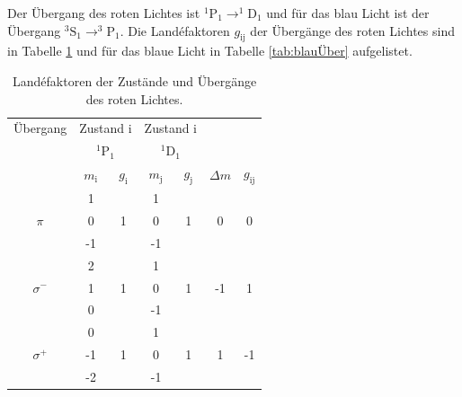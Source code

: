 Der Übergang des roten Lichtes ist $^1\text{P}_1 \rightarrow ^1\text{D}_1$ und für das 
blau Licht ist der Übergang $^3\text{S}_1 \rightarrow ^3\text{P}_1$.
Die Landéfaktoren $g_{\text{ij}}$ der Übergänge des roten Lichtes sind in Tabelle \ref{tab:rotÜber} und 
für das blaue Licht in Tabelle \ref{tab:blauÜber} aufgelistet.
\FloatBarrier
\begin{table}
    \centering
    \caption{Landéfaktoren der Zustände und Übergänge des roten Lichtes.}
    \label{tab:rotÜber}
    \begin{tabular}{c| c c| c c| c c}
        \toprule
        Übergang&\multicolumn{2}{c|}{Zustand i}&\multicolumn{2}{c|}{Zustand i}&\\
                &\multicolumn{2}{c|}{$^1\text{P}_1$}&\multicolumn{2}{c|}{$^1\text{D}_1$}&\\
        \midrule
        &$m_\text{i}$&$g_\text{i}$&$m_\text{j}$&$g_\text{j}$&$\Delta m $&$g_{\text{ij}}$\\
        \midrule
        \multirow{3}{*}{$\pi$}&1&\multirow{3}{*}{1}&1&\multirow{3}{*}{1}&\multirow{3}{*}{0}&\multirow{3}{*}{0}\\
        &0&&0&&&\\
        &-1&&-1&&&\\
        \hline
        \multirow{3}{*}{$\sigma^-$}&2&\multirow{3}{*}{1}&1&\multirow{3}{*}{1}&\multirow{3}{*}{-1}&\multirow{3}{*}{1}\\
        &1&&0&&&\\
        &0&&-1&&&\\
        \hline
        \multirow{3}{*}{$\sigma^+$}&0&\multirow{3}{*}{1}&1&\multirow{3}{*}{1}&\multirow{3}{*}{1}&\multirow{3}{*}{-1}\\
        &-1&&0&&&\\
        &-2&&-1&&&\\
        \bottomrule
    \end{tabular}
\end{table}
